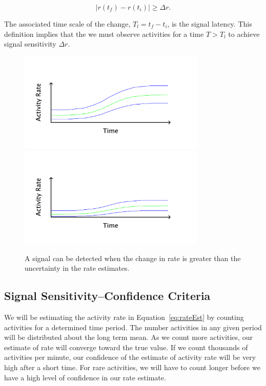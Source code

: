 \documentclass{article}
\begin{document}
\begin{equation}
    \label{eq:signal}
    | r(t_f) - r(t_i) | \geq \Delta r.
\end{equation}

The associated time scale of the change, $T_l = t_f - t_i$, is the signal latency.  This definition implies that the we must observe activities for a time $T > T_l$ to achieve signal sensitivity $\Delta r$.

%
\begin{figure}[h]
    \centering
    \includegraphics[width=3.5in]{./imgs/fig3a.pdf}
    \includegraphics[width=3.5in]{./imgs/fig3b.pdf}
        \caption{A signal can be detected when the change in rate is greater than the uncertainty in the rate estimates.}
    \label{fig:signal}
\end{figure}
%
%

\subsection{Signal Sensitivity--Confidence Criteria} 

We will be estimating the activity rate in Equation~\ref{eq:rateEst} by counting activities for a determined time period.  The
number activities in any given period will be distributed about the long term mean. As we count more activities, our
estimate of rate will converge toward the true value.  If we count thousands of activities per minute, our confidence of the estimate
of activity rate will be very high after a short time.  For rare activities, we will have to count longer before we have
a high level of confidence in our rate estimate.
\end{document}
